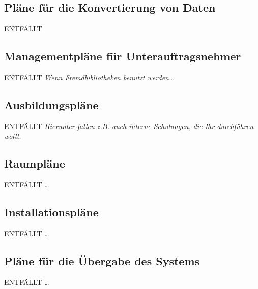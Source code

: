 \documentclass[fontsize=12pt,paper=a4,twoside]{scrartcl}
\begin{document}
\subsection{Pläne für die Konvertierung von Daten}
ENTFÄLLT

\subsection{Managementpläne für Unterauftragsnehmer}
ENTFÄLLT
{\em Wenn Fremdbibliotheken benutzt werden\dots}

\subsection{Ausbildungspläne}
ENTFÄLLT
{\em Hierunter fallen z.B. auch interne Schulungen, die Ihr
  durchführen wollt.}

\subsection{Raumpläne}
ENTFÄLLT
\dots

\subsection{Installationspläne}
ENTFÄLLT
\dots

\subsection{Pläne für die Übergabe des Systems}
ENTFÄLLT
\dots
\end{document}
